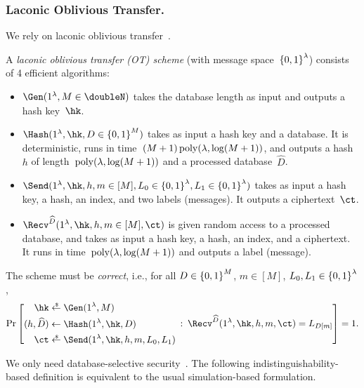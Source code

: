 \subsubsection{Laconic Oblivious Transfer.}
We rely on laconic oblivious transfer~\cite{C:CDGGMP17}.

\begin{definition}\label{def:lot}
A \emph{laconic oblivious transfer (OT) scheme} (with message space~${\{0,1\}}^\lambda$) consists of 4 efficient algorithms:
\begin{itemize}
\item $\Gen(1^\lambda,{M\in\doubleN})$ takes the database length as input and outputs a hash key~$\hk$.
\item $\Hash(1^\lambda,\hk,{D\in\bit^M})$ takes as input a hash key and a database.
It is deterministic,
runs in time~${(M+1)\operatorname{poly}(\lambda,\log(M+1))}$, and
outputs a hash $h$ of length~${\operatorname{poly}(\lambda,\log(M+1))}$ and a processed database~$\widehat{D}$.
\item $\Send(1^\lambda,\hk,h,{m\in[M]},{L_0\in\bit^\lambda},{L_1\in\bit^\lambda})$
takes as input a hash key, a hash, an index, and two labels (messages).
It outputs a ciphertext~$\ct$.
\item $\Recv^{\widehat{D}}(1^\lambda,\hk,h,{m\in[M]},\ct)$
is given random access to a processed database, and
takes as input a hash key, a hash, an index, and a ciphertext.
It runs in time~${\operatorname{poly}(\lambda,\log(M+1))}$ and outputs a label (message).
\end{itemize}
The scheme must be \emph{correct}, i.e., for all
${D\in{\{0,1\}}^M}$,
${m\in[M]}$,
${L_0,L_1\in{\{0,1\}}^\lambda}$,
\begin{align*}
\Pr\left[
\begin{aligned}
\hk&{}\draws\Gen(1^\lambda,M)\\
(h,\widehat{D})&{}\gets\Hash(1^\lambda,\hk,D)\\
\ct&{}\draws\Send(1^\lambda,\hk,h,m,L_0,L_1)
\end{aligned}
\::\:
\Recv^{\widehat{D}}(1^\lambda,\hk,h,m,\ct)=L_{D[m]}
\right]=1.
\end{align*}
\end{definition}

\noindent
We only need database-selective security~\cite{TCC:AnaLom18}.
The following indistinguishability-based definition is equivalent to the usual simulation-based formulation.

